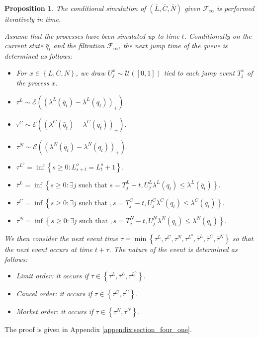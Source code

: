 \documentclass{article} %
\newtheorem{proposition}[theorem]{Proposition}
\newcommand{\1}{\mathbbm{1}} %
\begin{document}
\begin{proposition}
\label{prop:conditional_simulation}
The conditional simulation of $(\bar{L}, \bar{C}, \bar{N})$ given $\mathcal{F}_\infty$ is performed iteratively in time.

Assume that the processes have been simulated up to time $t$. 
Conditionally on the current state $\bar q_{t}$ and the filtration $\mathcal{F}_\infty$, the next jump time of the queue is determined as follows:

\begin{itemize}
    \item For $x \in \left \{ L, C , N\right \}$, we draw $U_j^{x} \sim \mathcal{U}([0,1])$ tied to each jump event $T_j^x$ of the process $x$.
    \item $\tau^L \sim \mathcal{E}((\lambda^L(\bar{q}_t) - \lambda^L(q_t))_+)$.
    \item $\tau^C \sim \mathcal{E}((\lambda^C(\bar{q}_t) - \lambda^C(q_t))_+)$.
    \item $\tau^N \sim \mathcal{E}((\lambda^N(\bar{q}_t) - \lambda^N(q_t))_+)$.
    \item $\tau^{L^o}= \inf \left \{s \geq 0: L^o_{s+t} = L^o_t+1\right \}$.
    \item $\bar{\tau}^L = \inf \left \{s \geq 0: \exists j \text{ such that } s = T_j^L - t, U_j^L \lambda^L(q_t) \leq \lambda^L(\bar{q}_t) \right \}$.
    \item $\bar{\tau}^C = \inf \left \{s \geq 0: \exists j \text{ such that }, s = T_j^C - t, U_j^C \lambda^C(q_t) \leq \lambda^C(\bar{q}_t) \right \}$.
    \item $\bar{\tau}^N = \inf \left \{s \geq 0: \exists j \text{ such that }, s = T_j^N - t, U_j^N \lambda^N(q_t) \leq \lambda^N(\bar{q}_t) \right \}$.
\end{itemize}

We then consider the next event time $\tau = \min \left \{ \tau^L, \tau^C, \tau^N, \tau^{L^o}, \bar{\tau}^L, \bar{\tau}^C, \bar{\tau}^N \right \}$ so that the next event occurs at time $t + \tau$. The nature of the event is determined as follows:
\begin{itemize}
    \item Limit order: it occurs if $\tau \in \left \{ \tau^L , \bar{\tau}^L, \tau^{L^o} \right \}$.
    \item Cancel order: it occurs if $\tau \in \left \{ \tau^C , \bar{\tau}^C \right \}$.
    \item Market order: it occurs if $\tau \in \left \{ \tau^N , \bar{\tau}^N \right \}$.
\end{itemize}
\end{proposition}
The proof is given in Appendix \ref{appendix:section_four_one}.
\end{document}
